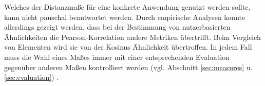 Welches der Distanzmaße für eine konkrete Anwendung genutzt werden sollte, kann nicht pauschal beantwortet werden. Durch empirische Analysen konnte allerdings gezeigt werden, dass bei der Bestimmung von nutzerbasierten Ähnlichkeiten die Pearson-Korrelation andere Metriken übertrifft. Beim Vergleich von Elementen wird sie von der Kosinus Ähnlichkeit übertroffen. In jedem Fall muss die Wahl eines Maßes immer mit einer entsprechenden Evaluation gegenüber anderen Maßen kontrolliert werden (vgl. Abschnitt \ref{sec:measures} u. \ref{sec:evaluation}) \citep[Kap. 2.1.2]{rs} \citep{Cacheda2011}.
